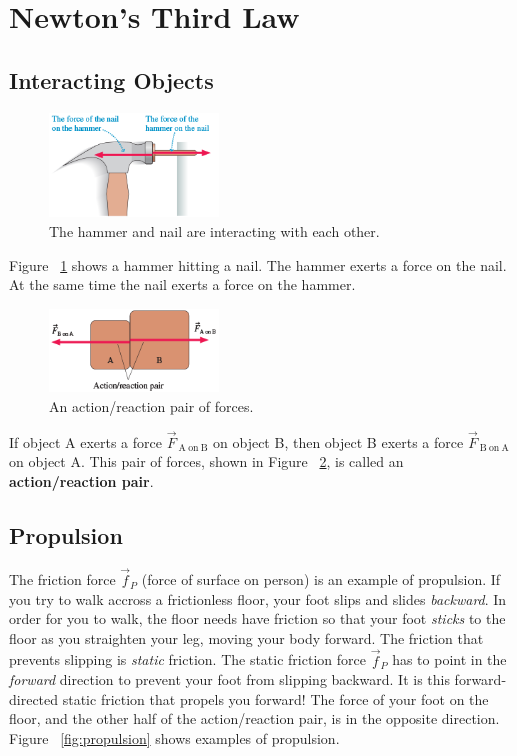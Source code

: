\section{Newton's Third Law}

\subsection{Interacting Objects}

\begin{figure}
    \centering
    \includegraphics[width=0.4\textwidth]{../figures/hammer-on-nail.png}
    \caption{The hammer and nail are interacting with each other.}%
    \label{fig:hammer-nail-interaction}
\end{figure}

Figure~%
\ref{fig:hammer-nail-interaction} shows a hammer hitting a nail.  The
hammer exerts a force on the nail.  At the same time the nail exerts a
force on the hammer.

\begin{figure}
    \centering
    \includegraphics[width=0.4\textwidth]{../figures/action-reaction-pair.png}
    \caption{An action/reaction pair of forces.}%
    \label{fig:action-reaction-pair}
\end{figure}

If object A exerts a force
$
    \vec{F}_{\mathrm{~A~on~B}}
$ on object B, then object B exerts a force
$
    \vec{F}_{\mathrm{~B~on~A}}
$ on object A. This pair of forces, shown in Figure~%
\ref{fig:action-reaction-pair}, is called an \textbf{action/reaction
pair}.

\subsection{Propulsion}

The friction force
$
    \vec{f}_P
$ (force of surface on person) is an example of propulsion.  If you try
to walk accross a frictionless floor, your foot slips and slides \emph{backward}.
In order for you to walk, the floor needs have friction so that your
foot \emph{sticks} to the floor as you straighten your leg, moving your
body forward.  The friction that prevents slipping is \emph{static}
friction.  The static friction force
$
    \vec{f}_P
$ has to point in the \emph{forward} direction to prevent your foot from
slipping backward.  It is this forward-directed static friction that
propels you forward!  The force of your foot on the floor, and the other
half of the action/reaction pair, is in the opposite direction.  Figure~%
\ref{fig:propulsion} shows examples of propulsion.

